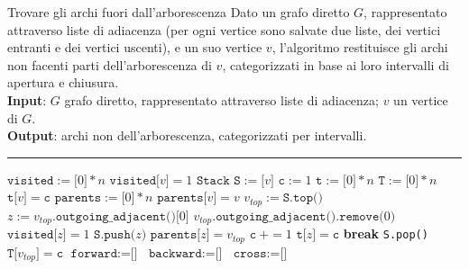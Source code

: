 \documentclass[a4paper, 12pt]{report}
\begin{document}
    \begin{framedalgo}[breakable]{Trovare gli archi fuori dall'arborescenza}
        Dato un grafo diretto $G$, rappresentato attraverso liste di adiacenza (per ogni vertice sono salvate due liste, dei vertici entranti e dei vertici uscenti), e un suo vertice $v$, l'algoritmo restituisce gli archi non facenti parti dell'arborescenza di $v$, categorizzati in base ai loro intervalli di apertura e chiusura.\\
        \textbf{Input}: $G$ grafo diretto, rappresentato attraverso liste di adiacenza; $v$ un vertice di $G$.\\
        \textbf{Output}: archi non dell'arborescenza, categorizzati per intervalli.

        \hrule
        \begin{algorithmic}[1]
                \State $\texttt{visited} := \texttt{[}0\texttt{]} * n$
                \State $\texttt{visited[}v\texttt{]}=1$
                \State $\texttt{Stack S}:=\texttt{[}v\texttt{]}$
                \State $\texttt{c}:=1$
                \State $\texttt{t} := \texttt{[}0\texttt{]} * n$ 
                \State $\texttt{T} := \texttt{[}0\texttt{]} * n$ 
                \State $\texttt{t[}v\texttt{]}=\texttt{c}$
                \State $\texttt{parents} := \texttt{[}0\texttt{]} * n$
                \State $\texttt{parents[}v\texttt{]}=v$ 
                    \State $v_{top} := \texttt{S.top()}$
                        \State $z:=v_{top}\texttt{.outgoing\_adjacent()[}0\texttt{]}$
                        \State $v_{top}\texttt{.outgoing\_adjacent().remove(}0\texttt{)}$
                            \State $\texttt{visited[}z\texttt{]}=1$
                            \State $\texttt{S.push(}z\texttt{)}$
                            \State $\texttt{parents[}z\texttt{]}=v_{top}$
                            \State $\texttt{c} \ += 1$
                            \State $\texttt{t[}z\texttt{]}=\texttt{c}$
                            \State \textbf{break}
                        \EndIf
                    \EndWhile
                        \State \texttt{S.pop()}
                        \State $\texttt{T[}v_{top}\texttt{]}=\texttt{c}$
                    \EndIf
                \EndWhile
                \State $\texttt{forward} := \texttt{[]}$
                \State $\texttt{backward} := \texttt{[]}$
                \State $\texttt{cross} := \texttt{[]}$


\end{algorithmic}
\end{framedalgo}
\end{document}
